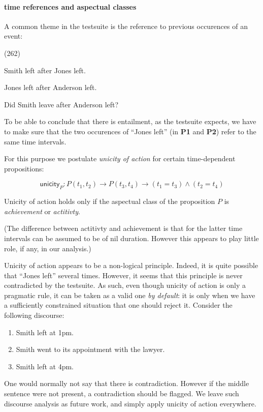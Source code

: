 \documentclass[a4paper,11pt]{article}
\newcommand\hyp{\item[H]}
\newcommand\fracasex[2]{\begin{lingex}\item[(#1)] \begin{subex} #2 \end{subex} \end{lingex} }
\newcommand\constant[1]{\mathsf{#1}}
\begin{document}
\paragraph{time references and aspectual classes}

A common theme in the testsuite is the reference to previous
occurences of an event:

\fracasex{262}{
\item	Smith left after Jones left.
\item	Jones left after Anderson left.
\hyp 	Did Smith leave after Anderson left?
}

To be able to conclude that there is entailment, as the testsuite expects, we have to make sure
that the two occurences of ``Jones left'' (in \textbf{P1} and \textbf{P2}) refer to the
same time intervals.

For this purpose we postulate \emph{unicity of action} for certain time-dependent
propositions:

\[\constant{unicity}_P : P (t_1,t_2) → P (t_3,t_4) → (t_1 = t_3) ∧ (t_2 = t_4)\]

Unicity of action holds only if the aspectual class of the proposition
$P$ is \emph{achievement} or \emph{actitivty}.

(The difference between actitivty and achievement is that for the
latter time intervals can be assumed to be of nil duration. However
this appears to play little role, if any, in our analysis.)

Unicity of action appears to be a non-logical principle. Indeed, it is
quite possible that ``Jones left'' several times. However, it seems
that this principle is never contradicted by the testsuite. As such,
even though unicity of action is only a pragmatic rule, it can be
taken as a valid one \emph{by default}: it is only when we have a
sufficiently constrained situation that one should reject it. Consider
the following discourse:
\begin{enumerate}[parsep=0pt,itemsep=1pt,label=(\arabic*)]
\item Smith left at 1pm.
\item Smith went to its appointment with the lawyer.
\item Smith left at 4pm.
\end{enumerate}
One would normally not say that there is contradiction. However if the
middle sentence were not present, a contradiction should be
flagged. We leave such discourse analysis as future work, and simply
apply unicity of action everywhere.
\end{document}
